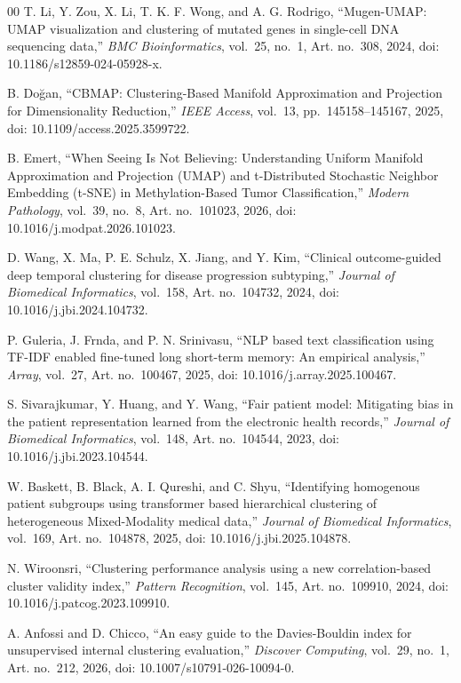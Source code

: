 \documentclass[a4paper,fleqn]{cas-dc}
\begin{document}
\begin{thebibliography}{00}
 T. Li, Y. Zou, X. Li, T. K. F. Wong, and A. G. Rodrigo, ``Mugen-UMAP: UMAP visualization and clustering of mutated genes in single-cell DNA sequencing data,'' \textit{BMC Bioinformatics}, vol.~25, no.~1, Art. no.~308, 2024, doi: 10.1186/s12859-024-05928-x.

 B. Doğan, ``CBMAP: Clustering-Based Manifold Approximation and Projection for Dimensionality Reduction,'' \textit{IEEE Access}, vol.~13, pp.~145158--145167, 2025, doi: 10.1109/access.2025.3599722.

 B. Emert, ``When Seeing Is Not Believing: Understanding Uniform Manifold Approximation and Projection (UMAP) and t-Distributed Stochastic Neighbor Embedding (t-SNE) in Methylation-Based Tumor Classification,'' \textit{Modern Pathology}, vol.~39, no.~8, Art. no.~101023, 2026, doi: 10.1016/j.modpat.2026.101023.

 D. Wang, X. Ma, P. E. Schulz, X. Jiang, and Y. Kim, ``Clinical outcome-guided deep temporal clustering for disease progression subtyping,'' \textit{Journal of Biomedical Informatics}, vol.~158, Art. no.~104732, 2024, doi: 10.1016/j.jbi.2024.104732.

 P. Guleria, J. Frnda, and P. N. Srinivasu, ``NLP based text classification using TF-IDF enabled fine-tuned long short-term memory: An empirical analysis,'' \textit{Array}, vol.~27, Art. no.~100467, 2025, doi: 10.1016/j.array.2025.100467.

 S. Sivarajkumar, Y. Huang, and Y. Wang, ``Fair patient model: Mitigating bias in the patient representation learned from the electronic health records,'' \textit{Journal of Biomedical Informatics}, vol.~148, Art. no.~104544, 2023, doi: 10.1016/j.jbi.2023.104544.

 W. Baskett, B. Black, A. I. Qureshi, and C. Shyu, ``Identifying homogenous patient subgroups using transformer based hierarchical clustering of heterogeneous Mixed-Modality medical data,'' \textit{Journal of Biomedical Informatics}, vol.~169, Art. no.~104878, 2025, doi: 10.1016/j.jbi.2025.104878.

 N. Wiroonsri, ``Clustering performance analysis using a new correlation-based cluster validity index,'' \textit{Pattern Recognition}, vol.~145, Art. no.~109910, 2024, doi: 10.1016/j.patcog.2023.109910.

 A. Anfossi and D. Chicco, ``An easy guide to the Davies-Bouldin index for unsupervised internal clustering evaluation,'' \textit{Discover Computing}, vol.~29, no.~1, Art. no.~212, 2026, doi: 10.1007/s10791-026-10094-0.


\end{thebibliography}
\end{document}
